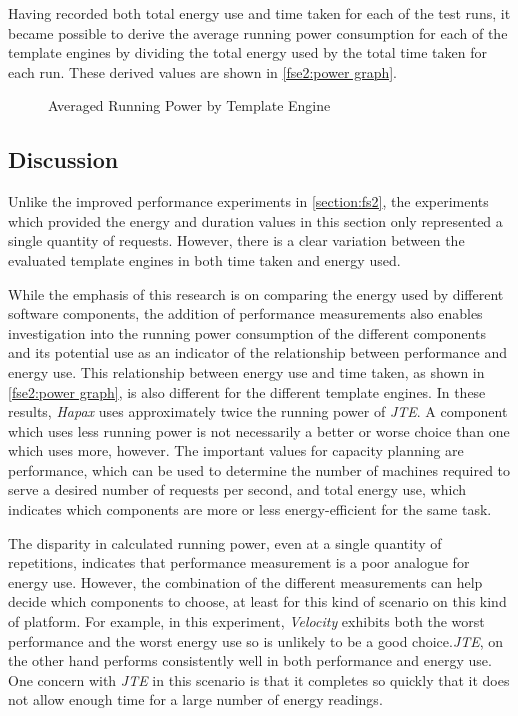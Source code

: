 Having recorded both total energy use and time taken for each of the test runs, it became possible to derive the average running power consumption for each of the template engines by dividing the total energy used by the total time taken for each run. These derived values are shown in \autoref{fse2:power graph}.

\begin{figure}[htbp]
  \centering
  
  \caption{Averaged Running Power by Template Engine}
  \label{fse2:power graph}
\end{figure}

\subsection{Discussion}
\label{fse2 discussion}

Unlike the improved performance experiments in \autoref{section:fs2}, the experiments which provided the energy and duration values in this section only represented a single quantity of requests. However, there is a clear variation between the evaluated template engines in both time taken and energy used. 

While the emphasis of this research is on comparing the energy used by different software components, the addition of performance measurements also enables investigation into the running power consumption of the different components and its potential use as an indicator of the relationship between performance and energy use. This relationship between energy use and time taken, as shown in \autoref{fse2:power graph}, is also different for the different template engines. In these results, \emph{Hapax} uses approximately twice the running power of \emph{JTE}. A component which uses less running power is not necessarily a better or worse choice than one which uses more, however. The important values for capacity planning are performance, which can be used to determine the number of machines required to serve a desired number of requests per second, and total energy use, which indicates which components are more or less energy-efficient for the same task.

The disparity in calculated running power, even at a single quantity of repetitions, indicates that performance measurement is a poor analogue for energy use. However, the combination of the different measurements can help decide which components to choose, at least for this kind of scenario on this kind of platform. For example, in this experiment, \emph{Velocity} exhibits both the worst performance and the worst energy use so is unlikely to be a good choice.\emph{JTE}, on the other hand performs consistently well in both performance and energy use. One concern with \emph{JTE} in this scenario is that it completes so quickly that it does not allow enough time for a large number of energy readings.


